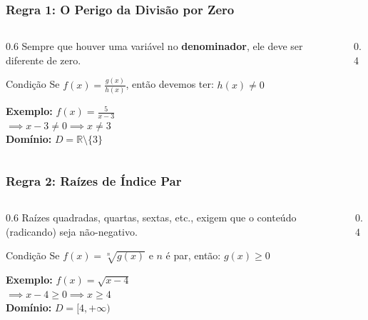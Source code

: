\documentclass[9pt]{beamer}
\begin{document}
\begin{frame}
\frametitle{Regra 1: O Perigo da Divisão por Zero}
\begin{columns}
\begin{column}{0.6\textwidth}
Sempre que houver uma variável no \textbf{denominador}, ele deve ser diferente de zero.

\begin{block}{Condição}
Se $f(x) = \frac{g(x)}{h(x)}$, então devemos ter:
\Large \centering $h(x) \neq 0$
\end{block}

\textbf{Exemplo:} $f(x) = \frac{5}{x - 3}$ \\
$\implies x - 3 \neq 0 \implies x \neq 3$ \\
\textbf{Domínio:} $D = \mathbb{R} \setminus \{3\}$
\end{column}

\begin{column}{0.4\textwidth}
\centering
{}
\end{column}
\end{columns}
\end{frame}

\begin{frame}
\frametitle{Regra 2: Raízes de Índice Par}
\begin{columns}
\begin{column}{0.6\textwidth}
Raízes quadradas, quartas, sextas, etc., exigem que o conteúdo (radicando) seja não-negativo.

\begin{block}{Condição}
Se $f(x) = \sqrt[n]{g(x)}$ e $n$ é par, então:
\Large \centering $g(x) \ge 0$
\end{block}

\textbf{Exemplo:} $f(x) = \sqrt{x - 4}$ \\
$\implies x - 4 \ge 0 \implies x \ge 4$ \\
\textbf{Domínio:} $D = [4, +\infty)$
\end{column}

\begin{column}{0.4\textwidth}
\centering
{}
\end{column}
\end{columns}
\end{frame}
\end{document}
